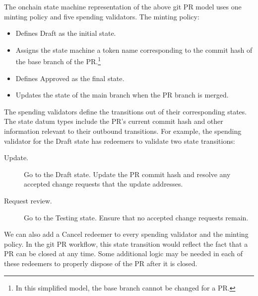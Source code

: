 \documentclass[../midgard.tex]{subfiles}
\begin{document}
The onchain state machine representation of the above git PR model uses one minting policy and five spending validators.
The minting policy:

\begin{itemize}
    \item Defines Draft as the initial state.
    \item Assigns the state machine a token name corresponding to the commit hash of the base branch of the PR.\footnote{In this simplified model, the base branch cannot be changed for a PR.}
    \item Defines Approved as the final state.
    \item Updates the state of the main branch when the PR branch is merged.
\end{itemize}

The spending validators define the transitions out of their corresponding states.
The state datum types include the PR's current commit hash and other information relevant to their outbound transitions.
For example, the spending validator for the Draft state has redeemers to validate two state transitions:
\begin{description}
    \item[Update.] Go to the Draft state.
      Update the PR commit hash and resolve any accepted change requests that the update addresses.
    \item[Request review.] Go to the Testing state.
      Ensure that no accepted change requests remain.
\end{description}

We can also add a Cancel redeemer to every spending validator and the minting policy.
In the git PR workflow, this state transition would reflect the fact that a PR can be closed at any time.
Some additional logic may be needed in each of these redeemers to properly dispose of the PR after it is closed.
\end{document}
